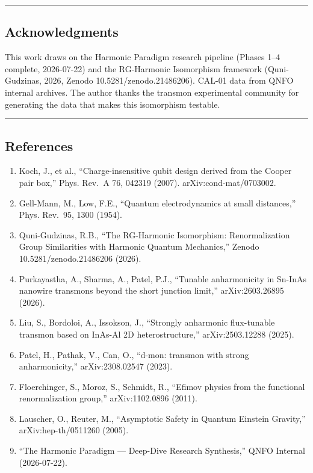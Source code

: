 \documentclass[
]{article}
\providecommand{\tightlist}{%
  \setlength{\itemsep}{0pt}\setlength{\parskip}{0pt}}
\begin{document}
\begin{center}\rule{0.5\linewidth}{0.5pt}\end{center}

\subsection{Acknowledgments}\label{acknowledgments}

This work draws on the Harmonic Paradigm research pipeline (Phases 1--4
complete, 2026-07-22) and the RG-Harmonic Isomorphism framework
(Quni-Gudzinas, 2026, Zenodo 10.5281/zenodo.21486206). CAL-01 data from
QNFO internal archives. The author thanks the transmon experimental
community for generating the data that makes this isomorphism testable.

\begin{center}\rule{0.5\linewidth}{0.5pt}\end{center}

\subsection{References}\label{references}

\begin{enumerate}
\def\labelenumi{\arabic{enumi}.}
\tightlist
\item
  Koch, J., et al., ``Charge-insensitive qubit design derived from the
  Cooper pair box,'' Phys. Rev.~A 76, 042319 (2007).
  arXiv:cond-mat/0703002.
\item
  Gell-Mann, M., Low, F.E., ``Quantum electrodynamics at small
  distances,'' Phys. Rev.~95, 1300 (1954).
\item
  Quni-Gudzinas, R.B., ``The RG-Harmonic Isomorphism: Renormalization
  Group Similarities with Harmonic Quantum Mechanics,'' Zenodo
  10.5281/zenodo.21486206 (2026).
\item
  Purkayastha, A., Sharma, A., Patel, P.J., ``Tunable anharmonicity in
  Sn-InAs nanowire transmons beyond the short junction limit,''
  arXiv:2603.26895 (2026).
\item
  Liu, S., Bordoloi, A., Issokson, J., ``Strongly anharmonic
  flux-tunable transmon based on InAs-Al 2D heterostructure,''
  arXiv:2503.12288 (2025).
\item
  Patel, H., Pathak, V., Can, O., ``d-mon: transmon with strong
  anharmonicity,'' arXiv:2308.02547 (2023).
\item
  Floerchinger, S., Moroz, S., Schmidt, R., ``Efimov physics from the
  functional renormalization group,'' arXiv:1102.0896 (2011).
\item
  Lauscher, O., Reuter, M., ``Asymptotic Safety in Quantum Einstein
  Gravity,'' arXiv:hep-th/0511260 (2005).
\item
  ``The Harmonic Paradigm --- Deep-Dive Research Synthesis,'' QNFO
  Internal (2026-07-22).
\end{enumerate}
\end{document}

